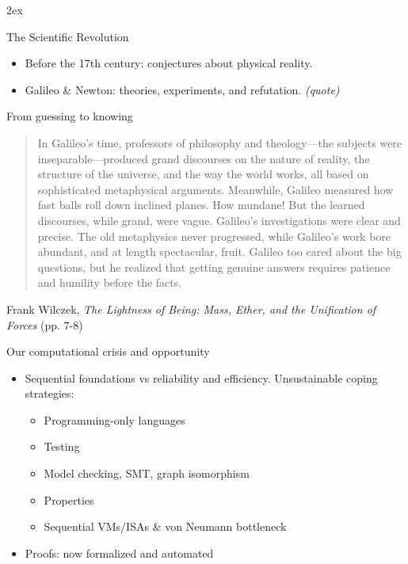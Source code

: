 \documentclass[aspectratio=169]{beamer}
\begin{document}
\parskip2ex

\begin{center}
\maketitle
{}
\end{center}

\begin{frame}{The Scientific Revolution}
\begin{itemize}\itemsep3ex
\item Before the 17th century: conjectures about physical reality.
\item Galileo \& Newton: theories, experiments, and refutation. \emph{(quote)}
\end{itemize}
\end{frame}

\begin{frame}{From guessing to knowing}
\vspace{8ex}
\begin{quotation}
In Galileo's time, professors of philosophy and theology---the subjects were inseparable---produced grand discourses on the nature of reality, the structure of the universe, and the way the world works, all based on sophisticated metaphysical arguments. Meanwhile, Galileo measured how fast balls roll down inclined planes. How mundane! But the learned discourses, while grand, were vague. Galileo's investigations were clear and precise. The old metaphysics never progressed, while Galileo's work bore abundant, and at length spectacular, fruit. Galileo too cared about the big questions, but he realized that getting genuine answers requires patience and humility before the facts.
\end{quotation}
Frank Wilczek, \emph{The Lightness of Being: Mass, Ether, and the Unification of Forces} (pp. 7-8)
\end{frame}

\begin{frame}{Our computational crisis and opportunity}
\begin{itemize}\itemsep3ex \parskip2ex
\item Sequential foundations vs reliability and efficiency.
Unsustainable coping strategies:
 \begin{itemize}\itemsep3ex
 \item Programming-only languages
 \item Testing
 \item Model checking, SMT, graph isomorphism
 \item Properties
 \item Sequential VMs/ISAs \& von Neumann bottleneck
 \end{itemize}
\item Proofs: now formalized and automated
\end{itemize}
\end{frame}
\end{document}
